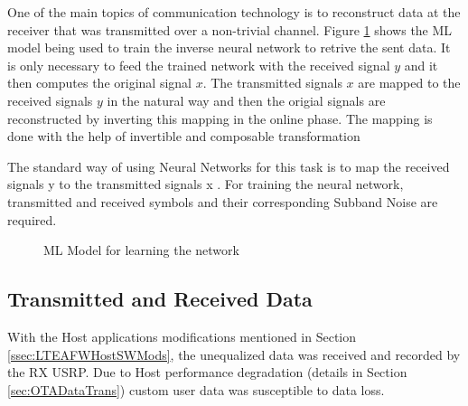 One of the main topics of communication technology is to reconstruct data at the
receiver that was transmitted over a non-trivial channel. Figure \ref{fig:MLModel} shows the ML model being used to train the inverse neural network to retrive the sent data. It is only necessary to feed the trained network with the received signal $y$ and it then computes the original signal $x$. The transmitted signals $x$ are mapped to the received signals $y$ in the natural way and then the origial signals are reconstructed by inverting this mapping in the online phase. The mapping is done with the help of invertible and composable transformation 


The standard way of using Neural Networks for this task is to map the received signals y to the transmitted signals x \cite{JMMLINN}. For training the neural network, transmitted and received symbols and their corresponding Subband Noise are required.

\begin{center}
    \begin{figure}[H]
    \caption{ML Model for learning the network}
    \label{fig:MLModel}
    \end{figure}
\end{center}

\subsection{Transmitted and Received Data}\label{ssec:XYPairs}

With the Host applications modifications mentioned in Section \ref{ssec:LTEAFWHostSWMods}, the unequalized data was received and recorded by the RX USRP. Due to Host performance degradation (details in Section \ref{sec:OTADataTrans}) custom user data was susceptible to data loss.

